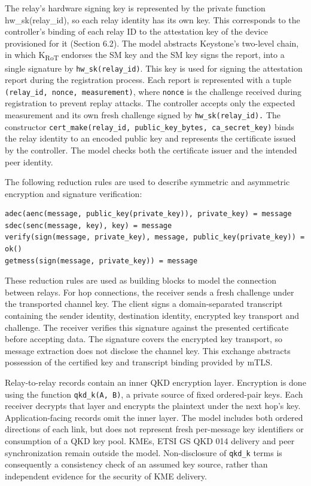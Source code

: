 \documentclass[futureinternet,article,submit,moreauthors]{Definitions/mdpi}
\begin{document}
The relay's hardware signing key is represented by the private function hw\_sk(relay\_id), so each relay identity has its own key. This corresponds to the controller's binding of each relay ID to the attestation key of the device provisioned for it (Section 6.2). The model abstracts Keystone's two-level chain, in which K\textsubscript{RoT} endorses the SM key and the SM key signs the report, into a single signature by \texttt{hw\_sk(relay\_id)}. This key is used for signing the attestation report during the registration process. Each report is represented with a tuple \texttt{(relay\_id, nonce, measurement)}, where \texttt{nonce} is the challenge received during registration to prevent replay attacks. The controller accepts only the expected measurement and its own fresh challenge signed by \texttt{hw\_sk(relay\_id).} The constructor \texttt{cert\_make(relay\_id, public\_key\_bytes, ca\_secret\_key)} binds the relay identity to an encoded public key and represents the certificate issued by the controller. The model checks both the certificate issuer and the intended peer identity.

The following reduction rules are used to describe symmetric and asymmetric encryption and signature verification:

\begin{lstlisting}
adec(aenc(message, public_key(private_key)), private_key) = message
sdec(senc(message, key), key) = message
verify(sign(message, private_key), message, public_key(private_key)) = ok()
getmess(sign(message, private_key)) = message
\end{lstlisting}

These reduction rules are used as building blocks to model the connection between relays. For hop connections, the receiver sends a fresh challenge under the transported channel key. The client signs a domain-separated transcript containing the sender identity, destination identity, encrypted key transport and challenge. The receiver verifies this signature against the presented certificate before accepting data. The signature covers the encrypted key transport, so message extraction does not disclose the channel key. This exchange abstracts possession of the certified key and transcript binding provided by mTLS.

Relay-to-relay records contain an inner QKD encryption layer. Encryption is done using the function \texttt{qkd\_k(A, B)}, a private source of fixed ordered-pair keys. Each receiver decrypts that layer and encrypts the plaintext under the next hop's key. Application-facing records omit the inner layer. The model includes both ordered directions of each link, but does not represent fresh per-message key identifiers or consumption of a QKD key pool. KMEs, ETSI GS QKD 014 delivery and peer synchronization remain outside the model. Non-disclosure of \texttt{qkd\_k} terms is consequently a consistency check of an assumed key source, rather than independent evidence for the security of KME delivery.
\end{document}
